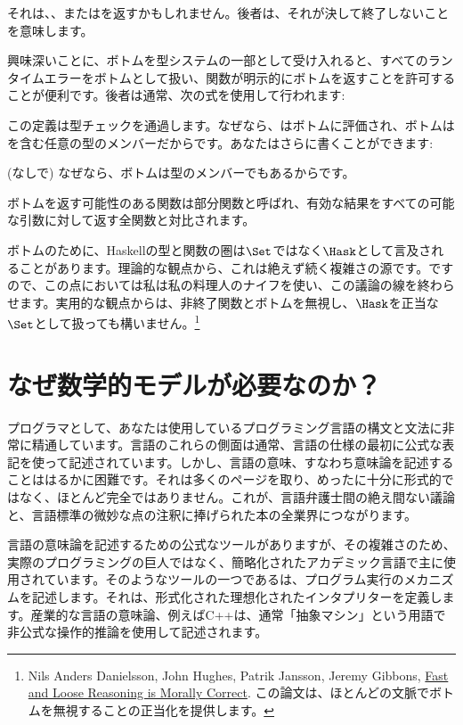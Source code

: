 それは、、または\code{\_|\_}を返すかもしれません。後者は、それが決して終了しないことを意味します。

興味深いことに、ボトムを型システムの一部として受け入れると、すべてのランタイムエラーをボトムとして扱い、関数が明示的にボトムを返すことを許可することが便利です。後者は通常、次の式を使用して行われます: 

この定義は型チェックを通過します。なぜなら、はボトムに評価され、ボトムはを含む任意の型のメンバーだからです。あなたはさらに書くことができます: 

 (なしで) なぜなら、ボトムは型のメンバーでもあるからです。

ボトムを返す可能性のある関数は部分関数と呼ばれ、有効な結果をすべての可能な引数に対して返す全関数と対比されます。

ボトムのために、Haskellの型と関数の圏は$\Set$ではなく$\Hask$として言及されることがあります。理論的な観点から、これは絶えず続く複雑さの源です。ですので、この点においては私は私の料理人のナイフを使い、この議論の線を終わらせます。実用的な観点からは、非終了関数とボトムを無視し、$\Hask$を正当な$\Set$として扱っても構いません。\footnote{Nils Anders Danielsson,
  John Hughes, Patrik Jansson, Jeremy Gibbons, \href{http://www.cs.ox.ac.uk/jeremy.gibbons/publications/fast+loose.pdf}{
    Fast and Loose Reasoning is Morally Correct}. この論文は、ほとんどの文脈でボトムを無視することの正当化を提供します。}

\section{なぜ数学的モデルが必要なのか？}

プログラマとして、あなたは使用しているプログラミング言語の構文と文法に非常に精通しています。言語のこれらの側面は通常、言語の仕様の最初に公式な表記を使って記述されています。しかし、言語の意味、すなわち意味論を記述することははるかに困難です。それは多くのページを取り、めったに十分に形式的ではなく、ほとんど完全ではありません。これが、言語弁護士間の絶え間ない議論と、言語標準の微妙な点の注釈に捧げられた本の全業界につながります。

言語の意味論を記述するための公式なツールがありますが、その複雑さのため、実際のプログラミングの巨人ではなく、簡略化されたアカデミック言語で主に使用されています。そのようなツールの一つであるは、プログラム実行のメカニズムを記述します。それは、形式化された理想化されたインタプリターを定義します。産業的な言語の意味論、例えばC++は、通常「抽象マシン」という用語で非公式な操作的推論を使用して記述されます。

